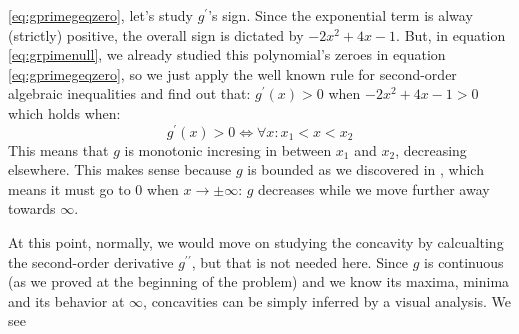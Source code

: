 \ref{eq:gprimegeqzero}, let's study $g^\prime$'s sign.
Since the exponential term is alway (strictly) positive, the overall sign is dictated
by $-2x^2 + 4x - 1$. But, in equation \ref{eq:grpimenull}, we already studied
this polynomial's zeroes in
equation \ref{eq:gprimegeqzero}, so we just apply the well known
rule
for second-order algebraic inequalities and find out that: $g^\prime(x) > 0$ when
$-2x^2 + 4x - 1 > 0$ which holds when:
\begin{equation*}
g^\prime(x) > 0 \iff \forall x: x_1 < x < x_2
\end{equation*}
This means that $g$ is monotonic incresing in between $x_1$ and $x_2$, decreasing
elsewhere. This makes sense because $g$ is bounded as we discovered in
, which means it must go to $0$ when $x \to \pm\infty$:
$g$ decreases while we move further away towards $\infty$.

At this point, normally, we would move on studying
the concavity by calcualting the second-order
derivative $g^{\prime\prime}$, but that is not needed here.
Since $g$ is continuous (as we proved at
the beginning of the problem) and we know its maxima, minima and its behavior at
$\infty$, concavities can be simply inferred by a visual
analysis.
We see

